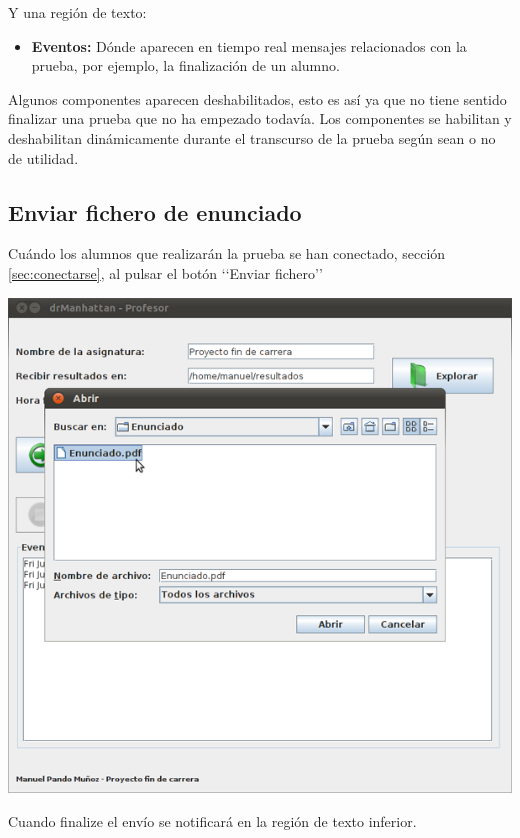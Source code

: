 \documentclass[a4paper,11pt]{article}
\begin{document}
Y una región de texto:

\begin{itemize}
    \item {\bfseries Eventos:} Dónde aparecen en tiempo real mensajes relacionados con la prueba, por ejemplo, la finalización de un alumno.
\end{itemize}

Algunos componentes aparecen deshabilitados, esto es así ya que no tiene sentido finalizar una prueba que no ha empezado todavía. Los componentes se habilitan y deshabilitan dinámicamente durante el transcurso de la prueba según sean o no de utilidad.


\subsection{Enviar fichero de enunciado}

Cuándo los alumnos que realizarán la prueba se han conectado, sección \ref{sec:conectarse}, al pulsar el botón \lq\lq Enviar fichero\rq\rq

\begin{center}
    \includegraphics[width=.90\linewidth]{imagenes/enviar}
\end{center}

Cuando finalize el envío se notificará en la región de texto inferior.
\end{document}
